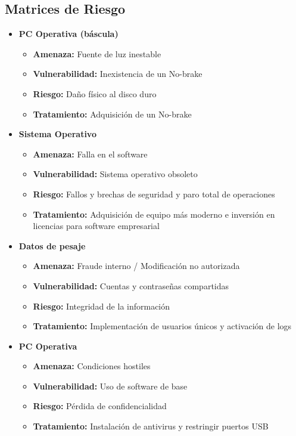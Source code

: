 \subsection{Matrices de Riesgo}

\begin{itemize}
    \item \textbf{PC Operativa (báscula)}
    \begin{itemize}
        \item \textbf{Amenaza:} Fuente de luz inestable
        \item \textbf{Vulnerabilidad:} Inexistencia de un No-brake
        \item \textbf{Riesgo:} Daño físico al disco duro
        \item \textbf{Tratamiento:} Adquisición de un No-brake
    \end{itemize}

    \item \textbf{Sistema Operativo}
    \begin{itemize}
        \item \textbf{Amenaza:} Falla en el software
        \item \textbf{Vulnerabilidad:} Sistema operativo obsoleto
        \item \textbf{Riesgo:} Fallos y brechas de seguridad y paro total de operaciones
        \item \textbf{Tratamiento:} Adquisición de equipo más moderno e inversión en licencias para software empresarial
    \end{itemize}

    \item \textbf{Datos de pesaje}
    \begin{itemize}
        \item \textbf{Amenaza:} Fraude interno / Modificación no autorizada
        \item \textbf{Vulnerabilidad:} Cuentas y contraseñas compartidas
        \item \textbf{Riesgo:} Integridad de la información
        \item \textbf{Tratamiento:} Implementación de usuarios únicos y activación de logs
    \end{itemize}

    \item \textbf{PC Operativa}
    \begin{itemize}
        \item \textbf{Amenaza:} Condiciones hostiles
        \item \textbf{Vulnerabilidad:} Uso de software de base
        \item \textbf{Riesgo:} Pérdida de confidencialidad
        \item \textbf{Tratamiento:} Instalación de antivirus y restringir puertos USB
    \end{itemize}


\end{itemize}

